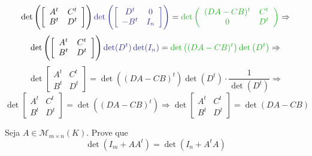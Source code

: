 \documentclass[11pt,a4paper]{article}
\begin{document}
{\[    \]
    \[
       \det\left( \left[\begin{array}{cc} A^t & C^t \\ B^t & D^t \end{array} \right] \right) \textcolor{Blue}{\det \left( \left[ \begin{array}{cc} D^t & 0 \\ -B^t & I_n \end{array} \right] \right)} = \textcolor{Verde}{\det \left( \begin{array}{cc} (DA - CB)^t & C^t \\ 0 & D^t \end{array} \right)} \Rightarrow
    \]
        \[
       \det\left( \left[\begin{array}{cc} A^t & C^t \\ B^t & D^t \end{array} \right] \right) \textcolor{Blue}{\det (D^t) \det(I_n)} = \textcolor{Verde}{\det \left((DA - CB)^t \right) \det\left(D^t \right)} \Rightarrow
    \]
            \[
       \det \left[\begin{array}{cc} A^t & C^t \\ B^t & D^t \end{array} \right] = \det \left((DA - CB)^t \right) \det\left(D^t \right)\cdot \frac{1}{\det\left(D^t \right)} \Rightarrow
    \]
                \[
       \det \left[\begin{array}{cc} A^t & C^t \\ B^t & D^t \end{array} \right] = \det \left((DA - CB)^t \right) \Rightarrow \boxed{  \det \left[\begin{array}{cc} A^t & C^t \\ B^t & D^t \end{array} \right] = \det \left(DA - CB \right)}
    \]
    }

 Seja $A \in \mathcal{M}_{m \times n}(K).$ Prove que
\[
\det(I_m + AA^t) = \det(I_n + A^tA)
\]
\end{document}
